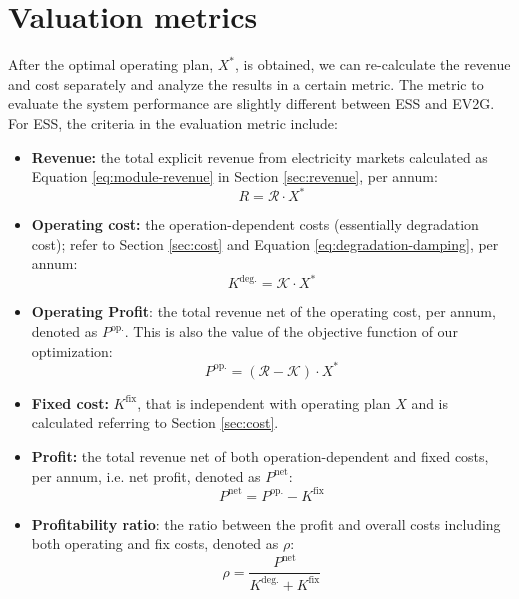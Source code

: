\section{Valuation metrics}
\label{sec:metrics}
After the optimal operating plan, $X^*$, is obtained, we can re-calculate the revenue and cost separately and analyze the results in a certain metric. The metric to evaluate the system performance are slightly different between ESS and EV2G. For ESS, the criteria in the evaluation metric include:
\begin{itemize}
	\item \textbf{Revenue:} the total explicit revenue from electricity markets calculated as Equation \eqref{eq:module-revenue} in Section \ref{sec:revenue}, per annum:
	\begin{equation*}
	R =  \mathcal{R} \cdot X^*
	\end{equation*}
	
	\item \textbf{Operating cost:} the operation-dependent costs (essentially degradation cost); refer to Section \ref{sec:cost} and Equation \eqref{eq:degradation-damping}, per annum:
	\begin{equation*}
	K^{\text{deg.}} =  \mathcal{K} \cdot X^*
	\end{equation*}
	
	\item \textbf{Operating Profit}: the total revenue net of the operating cost, per annum, denoted as $P^{\text{op.}}$. This is also the value of the objective function of our optimization: 
	\begin{equation*}
	P^{\text{op.}} = \left( \mathcal{R} - \mathcal{K} \right) \cdot X^*
	\end{equation*}
	
	\item \textbf{Fixed cost:} $K^{\text{fix}}$, that is independent with operating plan $X$ and is calculated referring to Section \ref{sec:cost}. 
	
	\item \textbf{Profit:} the total revenue net of both operation-dependent and fixed costs, per annum, i.e. net profit, denoted as $P^{\text{net}}$:
	\begin{equation*}
	P^{\text{net}} = P^{\text{op.}} - K^{\text{fix}}
	\end{equation*}
	
	\item  \textbf{Profitability ratio}: the ratio between the profit and overall costs including both operating and fix costs, denoted as $\rho$: 
	\begin{equation*}
	\rho = 	\frac{P^{\text{net}}}{K^{\text{deg.}} + K^{\text{fix}}}
	\end{equation*}
	
\end{itemize}

